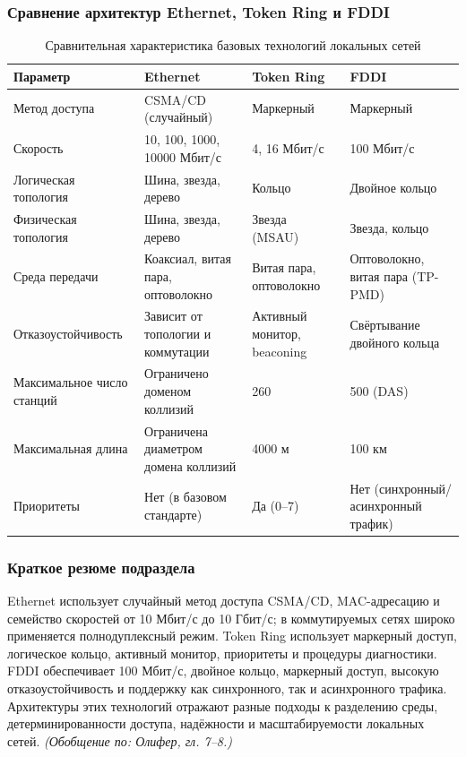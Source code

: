 \documentclass[a4paper,12pt]{article}
\begin{document}
\subsubsection{Сравнение архитектур Ethernet, Token Ring и FDDI}

\begin{table}[h]
\centering
\caption{Сравнительная характеристика базовых технологий локальных сетей}
\label{tab:lan-arch-compare}
\begin{tabular}{p{2.5cm}p{3.5cm}p{3.5cm}p{3.5cm}}
\toprule
\textbf{Параметр} & \textbf{Ethernet} & \textbf{Token Ring} & \textbf{FDDI} \\
\midrule
Метод доступа & CSMA/CD (случайный) & Маркерный & Маркерный \\
Скорость & 10, 100, 1000, 10000 Мбит/с & 4, 16 Мбит/с & 100 Мбит/с \\
Логическая топология & Шина, звезда, дерево & Кольцо & Двойное кольцо \\
Физическая топология & Шина, звезда, дерево & Звезда (MSAU) & Звезда, кольцо \\
Среда передачи & Коаксиал, витая пара, оптоволокно & Витая пара, оптоволокно & Оптоволокно, витая пара (TP-PMD) \\
Отказоустойчивость & Зависит от топологии и коммутации & Активный монитор, beaconing & Свёртывание двойного кольца \\
Максимальное число станций & Ограничено доменом коллизий & 260 & 500 (DAS) \\
Максимальная длина & Ограничена диаметром домена коллизий & 4000 м & 100 км \\
Приоритеты & Нет (в базовом стандарте) & Да (0–7) & Нет (синхронный/асинхронный трафик) \\
\bottomrule
\end{tabular}
\end{table}

\subsubsection{Краткое резюме подраздела}
Ethernet использует случайный метод доступа CSMA/CD, MAC-адресацию и семейство скоростей от 10 Мбит/с до 10 Гбит/с; в коммутируемых сетях широко применяется полнодуплексный режим. Token Ring использует маркерный доступ, логическое кольцо, активный монитор, приоритеты и процедуры диагностики. FDDI обеспечивает 100 Мбит/с, двойное кольцо, маркерный доступ, высокую отказоустойчивость и поддержку как синхронного, так и асинхронного трафика. Архитектуры этих технологий отражают разные подходы к разделению среды, детерминированности доступа, надёжности и масштабируемости локальных сетей.
\textit{(Обобщение по: Олифер, гл. 7–8.)}
\end{document}

